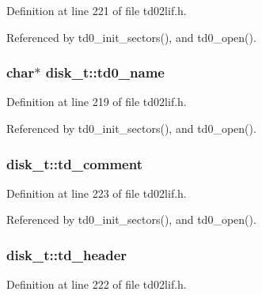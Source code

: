 Definition at line 221 of file td02lif.\+h.



Referenced by td0\+\_\+init\+\_\+sectors(), and td0\+\_\+open().

\subsubsection[{\texorpdfstring{td0\+\_\+name}{td0_name}}]{\setlength{\rightskip}{0pt plus 5cm}char$\ast$ disk\+\_\+t\+::td0\+\_\+name}\hypertarget{structdisk__t_a8be70c86aaffb22bab0e0969630a7062}{}\label{structdisk__t_a8be70c86aaffb22bab0e0969630a7062}


Definition at line 219 of file td02lif.\+h.



Referenced by td0\+\_\+init\+\_\+sectors(), and td0\+\_\+open().

\subsubsection[{\texorpdfstring{td\+\_\+comment}{td_comment}}]{ disk\+\_\+t\+::td\+\_\+comment}\hypertarget{structdisk__t_a7d84ffa6301a1e05b5a8a686d710bb8f}{}\label{structdisk__t_a7d84ffa6301a1e05b5a8a686d710bb8f}


Definition at line 223 of file td02lif.\+h.



Referenced by td0\+\_\+init\+\_\+sectors(), and td0\+\_\+open().

\subsubsection[{\texorpdfstring{td\+\_\+header}{td_header}}]{ disk\+\_\+t\+::td\+\_\+header}\hypertarget{structdisk__t_a83cf946593922db2bdedef21bb7b4aff}{}\label{structdisk__t_a83cf946593922db2bdedef21bb7b4aff}


Definition at line 222 of file td02lif.\+h.



